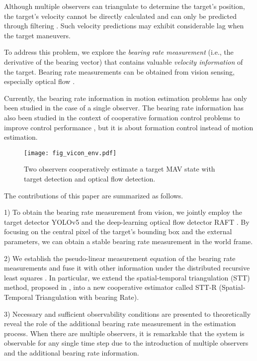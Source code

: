 \documentclass[letterpaper, 10 pt, conference]{ieeeconf}  %
\begin{document}
Although multiple observers can triangulate to determine the target's position, the target's velocity cannot be directly calculated and can only be predicted through filtering \cite{shen2013vision, gardner2022pose, riaz2022state}. Such velocity predictions may exhibit considerable lag when the target maneuvers. 

To address this problem, we explore the \emph{bearing rate measurement} (i.e., the derivative of the bearing vector) that contains valuable \emph{velocity information} of the target. 
Bearing rate measurements can be obtained from vision sensing, especially optical flow \cite{2020RAFT}.

Currently, the bearing rate information in motion estimation problems has only been studied in the case of a single observer. The bearing rate information has also been studied in the context of cooperative formation control problems to improve control performance \cite{zhao2019bearing}, but it is about formation control instead of motion estimation.

\begin{figure}
\centering
\texttt{[image: fig\_vicon\_env.pdf]}
\caption{Two observers cooperatively estimate a target MAV state with target detection and optical flow detection.}
\label{fig_env}
\end{figure}

The contributions of this paper are summarized as follows.

1) To obtain the bearing rate measurement from vision, we jointly employ the target detector YOLOv5 and the deep-learning optical flow detector RAFT \cite{2020RAFT}. 
By focusing on the central pixel of the target's bounding box and the external parameters, we can obtain a stable bearing rate measurement in the world frame.

2) We establish the pseudo-linear measurement equation of the bearing rate measurements and fuse it with other information under the distributed recursive least squares \cite{mateos2012distributed}. In particular, we extend the spatial-temporal triangulation (STT) method, proposed in \cite{zheng2023optimal}, into a new cooperative estimator called STT-R (Spatial-Temporal Triangulation with bearing Rate).

3) Necessary and sufficient observability conditions are presented to theoretically reveal the role of the additional bearing rate measurement in the estimation process. When there are multiple observers, it is remarkable that the system is observable for any single time step due to the introduction of multiple observers and the additional bearing rate information.
\end{document}
